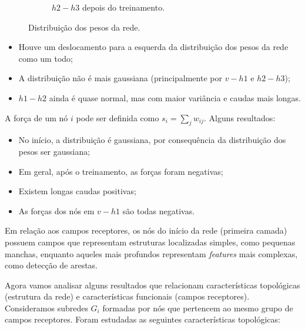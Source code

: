 \documentclass{article}
\begin{document}
\begin{figure}[h!]
\begin{center}
\begin{subfigure}{0.5\textwidth}
                        \caption{$h2 - h3$ depois do treinamento.}
                    \end{subfigure}
                \end{center}
                \caption{Distribuição dos pesos da rede.}
                \label{fig6}
            \end{figure}

            \begin{itemize}
                \item Houve um deslocamento para a esquerda da distribuição dos pesos da rede como um todo;
                \item A distribuição não é mais gaussiana (principalmente por $v - h1$ e $h2 - h3$);
                \item $h1 - h2$ ainda é quase normal, mas com maior variância e caudas mais longas.
            \end{itemize}

            A força de um nó $i$ pode ser definida como $s_i = \sum_j w_{ij}$. Alguns resultados:

            \begin{itemize}
                \item No início, a distribuição é gaussiana, por consequência da distribuição dos pesos ser gaussiana;
                \item Em geral, após o treinamento, as forças foram negativas;
                \item Existem longas caudas positivas;
                \item As forças dos nós em $v - h1$ são todas negativas.
            \end{itemize}

            Em relação aos campos receptores, os nós do início da rede (primeira camada) possuem campos que representam estruturas localizadas simples, como pequenas manchas,
            enquanto aqueles mais profundos representam \textit{features} mais complexas, como detecção de arestas.

            Agora vamos analisar alguns resultados que relacionam características topológicas (estrutura da rede) e características funcionais (campos receptores).
            Consideramos subredes $G_i$ formadas por nós que pertencem ao mesmo grupo de campos receptores.
            Foram estudadas as seguintes características topológicas:
\end{document}

